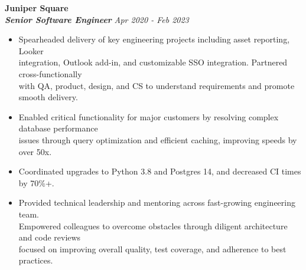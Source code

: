 \documentclass[]{resume}
\newcommand\tab[1][.5cm]{\hspace*{#1}}
\begin{document}
\begin{resume}
\vspace{0.9mm}
\textbf{\large Juniper Square}\\
\tab \textbf{\textit{Senior Software Engineer}} \hfill \textit{Apr 2020 - Feb 2023}
\begin{itemize}
    \item
    Spearheaded delivery of key engineering projects including asset reporting, Looker \\
    integration, Outlook add-in, and customizable SSO integration. Partnered cross-functionally \\
    with QA, product, design, and CS to understand requirements and promote smooth delivery.
    \item
    Enabled critical functionality for major customers by resolving complex database performance \\
    issues through query optimization and efficient caching, improving speeds by over 50x.
    \item
    Coordinated upgrades to Python 3.8 and Postgres 14, and decreased CI times by 70\%+.
    \item
    Provided technical leadership and mentoring across fast-growing engineering team. \\
    Empowered colleagues to overcome obstacles through diligent architecture and code reviews \\
    focused on improving overall quality, test coverage, and adherence to best practices.
\end{itemize}


\end{resume}
\end{document}
